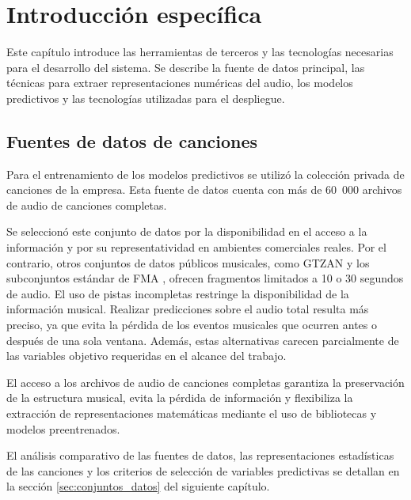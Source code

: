 \chapter{Introducción específica} %

\label{Chapter2}

Este capítulo introduce las herramientas de terceros y las tecnologías necesarias para el desarrollo del sistema. Se describe la fuente de datos principal, las técnicas para extraer representaciones numéricas del audio, los modelos predictivos y las tecnologías utilizadas para el despliegue.

\section{Fuentes de datos de canciones}
\label{sec:datos}

Para el entrenamiento de los modelos predictivos se utilizó la colección privada de canciones de la empresa. Esta fuente de datos cuenta con más de 60~000 archivos de audio de canciones completas.

Se seleccionó este conjunto de datos por la disponibilidad en el acceso a la información y por su representatividad en ambientes comerciales reales. Por el contrario, otros conjuntos de datos públicos musicales, como GTZAN \citep{GTZAN} y los subconjuntos estándar de FMA \citep{FMA}, ofrecen fragmentos limitados a 10 o 30 segundos de audio. El uso de pistas incompletas restringe la disponibilidad de la información musical. Realizar predicciones sobre el audio total resulta más preciso, ya que evita la pérdida de los eventos musicales que ocurren antes o después de una sola ventana. Además, estas alternativas carecen parcialmente de las variables objetivo requeridas en el alcance del trabajo.

El acceso a los archivos de audio de canciones completas garantiza la preservación de la estructura musical, evita la pérdida de información y flexibiliza la extracción de representaciones matemáticas mediante el uso de bibliotecas y modelos preentrenados.

El análisis comparativo de las fuentes de datos, las representaciones estadísticas de las canciones y los criterios de selección de variables predictivas se detallan en la sección \ref{sec:conjuntos_datos} del siguiente capítulo.

